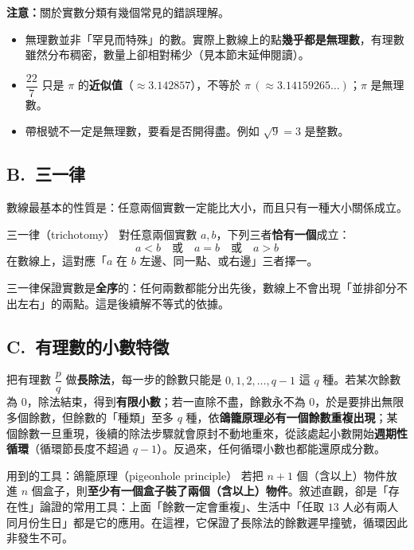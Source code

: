 \documentclass[11pt]{article}
\begin{document}

\textbf{注意：}關於實數分類有幾個常見的錯誤理解。
\begin{itemize}\setlength{\itemsep}{1pt}
\item 無理數並非「罕見而特殊」的數。實際上數線上的點\textbf{幾乎都是無理數}，有理數雖然分布稠密，數量上卻相對稀少（見本節末延伸閱讀）。
\item $\dfrac{22}{7}$ 只是 $\pi$ 的\textbf{近似值}（$\approx 3.142857$），不等於 $\pi\,(\approx 3.14159265\ldots)$；$\pi$ 是無理數。
\item 帶根號不一定是無理數，要看是否開得盡。例如 $\sqrt9=3$ 是整數。
\end{itemize}

\subsection*{\sffamily B.\ 三一律}

數線最基本的性質是：任意兩個實數一定能比大小，而且只有一種大小關係成立。

\begin{補充框}{三一律（trichotomy）}
對任意兩個實數 $a,b$，下列三者\textbf{恰有一個}成立：
$$\boxed{\;a<b\quad\text{或}\quad a=b\quad\text{或}\quad a>b\;}$$
在數線上，這對應「$a$ 在 $b$ 左邊、同一點、或右邊」三者擇一。

三一律保證實數是\textbf{全序}的：任何兩數都能分出先後，數線上不會出現「並排卻分不出左右」的兩點。這是後續解不等式的依據。
\end{補充框}

\subsection*{\sffamily C.\ 有理數的小數特徵}

把有理數 $\dfrac{p}{q}$ 做\textbf{長除法}，每一步的餘數只能是 $0,1,2,\ldots,q-1$ 這 $q$ 種。若某次餘數為 $0$，除法結束，得到\textbf{有限小數}；若一直除不盡，餘數永不為 $0$，於是要排出無限多個餘數，但餘數的「種類」至多 $q$ 種，依\textbf{鴿籠原理}\textbf{必有一個餘數重複出現}；某個餘數一旦重現，後續的除法步驟就會原封不動地重來，從該處起小數開始\textbf{週期性循環}（循環節長度不超過 $q-1$）。反過來，任何循環小數也都能還原成分數。

\begin{補充框}{用到的工具：鴿籠原理（pigeonhole principle）}
若把 $n+1$ 個（含以上）物件放進 $n$ 個盒子，則\textbf{至少有一個盒子裝了兩個（含以上）物件}。敘述直觀，卻是「存在性」論證的常用工具：上面「餘數一定會重複」、生活中「任取 $13$ 人必有兩人同月份生日」都是它的應用。在這裡，它保證了長除法的餘數遲早撞號，循環因此非發生不可。
\end{補充框}
\end{document}
